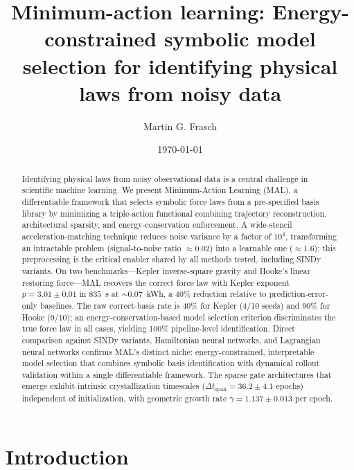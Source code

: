\documentclass[aps,pre,reprint,superscriptaddress,longbibliography]{revtex4-2}
\begin{document}
\title{Minimum-action learning: Energy-constrained symbolic model selection for identifying physical laws from noisy data}

\author{Martin G. Frasch}

\date{\today}

\begin{abstract}
Identifying physical laws from noisy observational data is a central challenge in scientific machine learning. We present Minimum-Action Learning (MAL), a differentiable framework that selects symbolic force laws from a pre-specified basis library by minimizing a triple-action functional combining trajectory reconstruction, architectural sparsity, and energy-conservation enforcement. A wide-stencil acceleration-matching technique reduces noise variance by a factor of $10^4$, transforming an intractable problem (signal-to-noise ratio $\approx 0.02$) into a learnable one ($\approx 1.6$); this preprocessing is the critical enabler shared by all methods tested, including SINDy variants. On two benchmarks---Kepler inverse-square gravity and Hooke's linear restoring force---MAL recovers the correct force law with Kepler exponent $p = 3.01 \pm 0.01$ in $835$~s at $\sim\!0.07$~kWh, a 40\% reduction relative to prediction-error-only baselines. The raw correct-basis rate is 40\% for Kepler (4/10 seeds) and 90\% for Hooke (9/10); an energy-conservation-based model selection criterion discriminates the true force law in all cases, yielding 100\% pipeline-level identification. Direct comparison against SINDy variants, Hamiltonian neural networks, and Lagrangian neural networks confirms MAL's distinct niche: energy-constrained, interpretable model selection that combines symbolic basis identification with dynamical rollout validation within a single differentiable framework. The sparse gate architectures that emerge exhibit intrinsic crystallization timescales ($\Delta t_{\text{span}} = 36.2 \pm 4.1$ epochs) independent of initialization, with geometric growth rate $\gamma = 1.137 \pm 0.013$ per epoch.
\end{abstract}

\maketitle

\section{Introduction}
\end{document}
